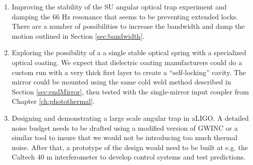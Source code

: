 \begin{enumerate}
	\item Improving the stability  of the SU angular optical trap experiment and damping the 66 Hz resonance that seems to be preventing extended locks.
	There are a number of possibilities to increase the bandwidth and damp the motion outlined in Section \ref{sec:bandwidth}.
	\item Exploring the possibility of a a single stable optical spring with a specialized optical coating.
	We expect that dielectric coating manufacturers could do a custom run with a very thick first layer to create a ``self-locking'' cavity. The mirror could be mounted using the same cold weld method described in Section \ref{sec:endMirror}, then tested with the single-mirror input coupler from Chapter \ref{ch:photothermal}. 
	\item Designing and demonstrating a large scale angular trap in aLIGO.
	A detailed noise budget needs to be drafted using a modified version of GWINC or a similar tool to insure that we would not be introducing too much thermal noise.
	After that, a prototype of the design would need to be built at e.g. the Caltech 40 m interferometer to develop control systems and test predictions.
\end{enumerate}



